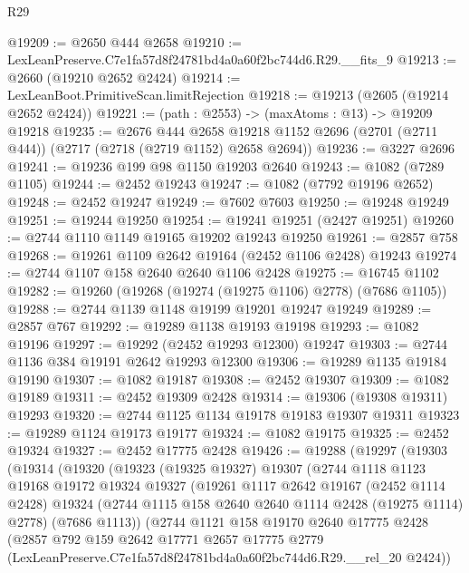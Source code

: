 \begin{lexlean}{R29}
\begin{coremodule}
@19209 := @2650 @444 @2658
@19210 := LexLeanPreserve.C7e1fa57d8f24781bd4a0a60f2bc744d6.R29.__fits_9
@19213 := @2660 (@19210 @2652 @2424)
@19214 := LexLeanBoot.PrimitiveScan.limitRejection
@19218 := @19213 (@2605 (@19214 @2652 @2424))
@19221 := (path : @2553) -> (maxAtoms : @13) -> @19209 @19218
@19235 := @2676
    @444
    @2658
    @19218
    @1152
    @2696
    (@2701 (@2711 @444))
    (@2717 (@2718 (@2719 @1152) @2658 @2694))
@19236 := @3227 @2696
@19241 := @19236 @199 @98 @1150 @19203 @2640
@19243 := @1082 (@7289 @1105)
@19244 := @2452 @19243
@19247 := @1082 (@7792 @19196 @2652)
@19248 := @2452 @19247
@19249 := @7602 @7603
@19250 := @19248 @19249
@19251 := @19244 @19250
@19254 := @19241 @19251 (@2427 @19251)
@19260 := @2744 @1110 @1149 @19165 @19202 @19243 @19250
@19261 := @2857 @758
@19268 := @19261 @1109 @2642 @19164 (@2452 @1106 @2428) @19243
@19274 := @2744 @1107 @158 @2640 @2640 @1106 @2428
@19275 := @16745 @1102
@19282 := @19260 (@19268 (@19274 (@19275 @1106) @2778) (@7686 @1105))
@19288 := @2744 @1139 @1148 @19199 @19201 @19247 @19249
@19289 := @2857 @767
@19292 := @19289 @1138 @19193 @19198
@19293 := @1082 @19196
@19297 := @19292 (@2452 @19293 @12300) @19247
@19303 := @2744 @1136 @384 @19191 @2642 @19293 @12300
@19306 := @19289 @1135 @19184 @19190
@19307 := @1082 @19187
@19308 := @2452 @19307
@19309 := @1082 @19189
@19311 := @2452 @19309 @2428
@19314 := @19306 (@19308 @19311) @19293
@19320 := @2744 @1125 @1134 @19178 @19183 @19307 @19311
@19323 := @19289 @1124 @19173 @19177
@19324 := @1082 @19175
@19325 := @2452 @19324
@19327 := @2452 @17775 @2428
@19426 := @19288
    (@19297
      (@19303
        (@19314
          (@19320
            (@19323
              (@19325 @19327)
              @19307
              (@2744
                @1118
                @1123
                @19168
                @19172
                @19324
                @19327
                (@19261
                  @1117
                  @2642
                  @19167
                  (@2452 @1114 @2428)
                  @19324
                  (@2744 @1115 @158 @2640 @2640 @1114 @2428 (@19275 @1114) @2778)
                  (@7686 @1113))
                (@2744
                  @1121
                  @158
                  @19170
                  @2640
                  @17775
                  @2428
                  (@2857
                    @792
                    @159
                    @2642
                    @17771
                    @2657
                    @17775
                    @2779
                    (LexLeanPreserve.C7e1fa57d8f24781bd4a0a60f2bc744d6.R29.__rel_20 @2424))

\end{coremodule}
\end{lexlean}
